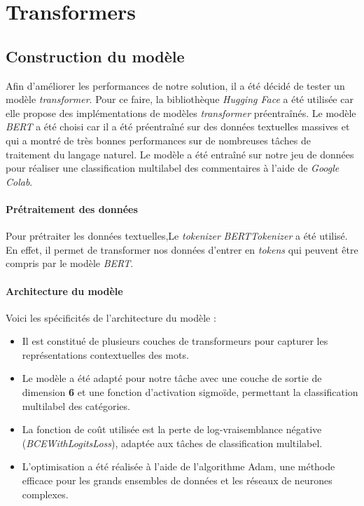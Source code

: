 \chapter{Transformers}

\section{Construction du modèle}

Afin d'améliorer les performances de notre solution, il a été décidé de tester un modèle \textit{transformer}.
Pour ce faire, la bibliothèque \textit{Hugging Face} a été utilisée car elle propose des implémentations de modèles \textit{transformer} préentraînés.
Le modèle \textit{BERT} a été choisi car il a été préentraîné sur des données textuelles massives et qui a montré de très bonnes performances sur de nombreuses tâches de traitement du langage naturel.
Le modèle a été entraîné sur notre jeu de données pour réaliser une classification multilabel des commentaires à l'aide de \textit{Google Colab}.

\subsubsection{Prétraitement des données}

Pour prétraiter les données textuelles,Le \textit{tokenizer} \textit{BERTTokenizer} a été utilisé. En effet, il permet de transformer nos données d'entrer en \textit{tokens} qui peuvent être compris par le modèle \textit{BERT}.

\subsubsection{Architecture du modèle}

Voici les spécificités de l'architecture du modèle :

\begin{itemize}
\item Il est constitué de plusieurs couches de transformeurs pour capturer les représentations contextuelles des mots.
\item Le modèle a été adapté pour notre tâche avec une couche de sortie de dimension \textbf{6} et une fonction d'activation sigmoïde, permettant la classification multilabel des catégories.
\item La fonction de coût utilisée est la perte de log-vraisemblance négative (\textit{BCEWithLogitsLoss}), adaptée aux tâches de classification multilabel.
\item L'optimisation a été réalisée à l'aide de l'algorithme Adam, une méthode efficace pour les grands ensembles de données et les réseaux de neurones complexes.
\end{itemize}


